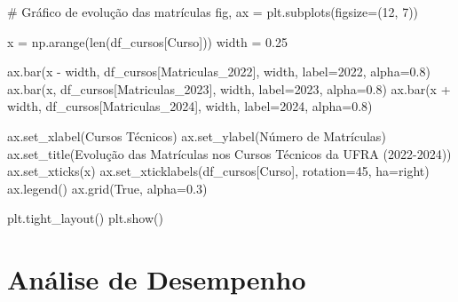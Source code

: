 \documentclass[
  12pt,
  letterpaper,
]{report}
\newenvironment{Shaded}{\begin{snugshade}}{\end{snugshade}}
\newcommand{\BuiltInTok}[1]{\textcolor[rgb]{0.00,0.23,0.31}{#1}}
\newcommand{\CommentTok}[1]{\textcolor[rgb]{0.37,0.37,0.37}{#1}}
\newcommand{\DecValTok}[1]{\textcolor[rgb]{0.68,0.00,0.00}{#1}}
\newcommand{\FloatTok}[1]{\textcolor[rgb]{0.68,0.00,0.00}{#1}}
\newcommand{\NormalTok}[1]{\textcolor[rgb]{0.00,0.23,0.31}{#1}}
\newcommand{\OperatorTok}[1]{\textcolor[rgb]{0.37,0.37,0.37}{#1}}
\newcommand{\StringTok}[1]{\textcolor[rgb]{0.13,0.47,0.30}{#1}}
\newcommand{\VariableTok}[1]{\textcolor[rgb]{0.07,0.07,0.07}{#1}}
\begin{document}
\begin{Shaded}
\begin{Highlighting}[]
\CommentTok{\# Gráfico de evolução das matrículas}
\NormalTok{fig, ax }\OperatorTok{=}\NormalTok{ plt.subplots(figsize}\OperatorTok{=}\NormalTok{(}\DecValTok{12}\NormalTok{, }\DecValTok{7}\NormalTok{))}

\NormalTok{x }\OperatorTok{=}\NormalTok{ np.arange(}\BuiltInTok{len}\NormalTok{(df\_cursos[}\StringTok{\textquotesingle{}Curso\textquotesingle{}}\NormalTok{]))}
\NormalTok{width }\OperatorTok{=} \FloatTok{0.25}

\NormalTok{ax.bar(x }\OperatorTok{{-}}\NormalTok{ width, df\_cursos[}\StringTok{\textquotesingle{}Matriculas\_2022\textquotesingle{}}\NormalTok{], width, label}\OperatorTok{=}\StringTok{\textquotesingle{}2022\textquotesingle{}}\NormalTok{, alpha}\OperatorTok{=}\FloatTok{0.8}\NormalTok{)}
\NormalTok{ax.bar(x, df\_cursos[}\StringTok{\textquotesingle{}Matriculas\_2023\textquotesingle{}}\NormalTok{], width, label}\OperatorTok{=}\StringTok{\textquotesingle{}2023\textquotesingle{}}\NormalTok{, alpha}\OperatorTok{=}\FloatTok{0.8}\NormalTok{)}
\NormalTok{ax.bar(x }\OperatorTok{+}\NormalTok{ width, df\_cursos[}\StringTok{\textquotesingle{}Matriculas\_2024\textquotesingle{}}\NormalTok{], width, label}\OperatorTok{=}\StringTok{\textquotesingle{}2024\textquotesingle{}}\NormalTok{, alpha}\OperatorTok{=}\FloatTok{0.8}\NormalTok{)}

\NormalTok{ax.set\_xlabel(}\StringTok{\textquotesingle{}Cursos Técnicos\textquotesingle{}}\NormalTok{)}
\NormalTok{ax.set\_ylabel(}\StringTok{\textquotesingle{}Número de Matrículas\textquotesingle{}}\NormalTok{)}
\NormalTok{ax.set\_title(}\StringTok{\textquotesingle{}Evolução das Matrículas nos Cursos Técnicos da UFRA (2022{-}2024)\textquotesingle{}}\NormalTok{)}
\NormalTok{ax.set\_xticks(x)}
\NormalTok{ax.set\_xticklabels(df\_cursos[}\StringTok{\textquotesingle{}Curso\textquotesingle{}}\NormalTok{], rotation}\OperatorTok{=}\DecValTok{45}\NormalTok{, ha}\OperatorTok{=}\StringTok{\textquotesingle{}right\textquotesingle{}}\NormalTok{)}
\NormalTok{ax.legend()}
\NormalTok{ax.grid(}\VariableTok{True}\NormalTok{, alpha}\OperatorTok{=}\FloatTok{0.3}\NormalTok{)}

\NormalTok{plt.tight\_layout()}
\NormalTok{plt.show()}
\end{Highlighting}
\end{Shaded}

\section{Análise de Desempenho}\label{anuxe1lise-de-desempenho}
\end{document}
